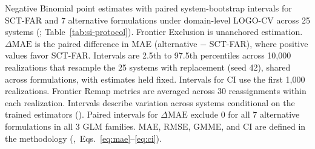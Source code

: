 \documentclass{article}
\begin{document}
\begin{table}[H]
\begin{minipage}{\linewidth}
\footnotesize
Negative Binomial point estimates with paired system-bootstrap intervals for SCT-FAR and 7 alternative formulations under domain-level LOGO-CV across 25 systems (; Table~\ref{tab:si-protocol}). Frontier Exclusion is unanchored estimation. $\Delta\mathrm{MAE}$ is the paired difference in MAE (alternative $-$ SCT-FAR), where positive values favor SCT-FAR. Intervals are 2.5th to 97.5th percentiles across 10,000 realizations that resample the 25 systems with replacement (seed 42), shared across formulations, with estimates held fixed. Intervals for CI use the first 1,000 realizations. Frontier Remap metrics are averaged across 30 reassignments within each realization. Intervals describe variation across systems conditional on the trained estimators (). Paired intervals for $\Delta\mathrm{MAE}$ exclude 0 for all 7 alternative formulations in all 3 GLM families. MAE, RMSE, GMME, and CI are defined in the methodology (,~Eqs.~\eqref{eq:mae}--\eqref{eq:ci}).
\end{minipage}
\end{table}
\end{document}
